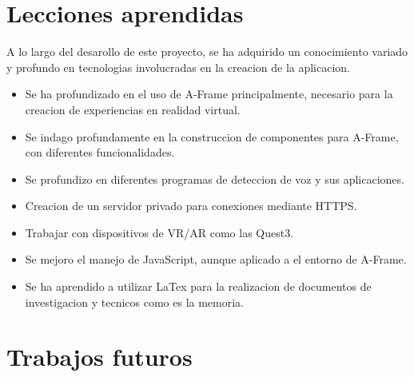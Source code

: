 \documentclass[a4paper, 12pt]{book}
\begin{document}
\section{Lecciones aprendidas}
\label{sec:lecciones_aprendidas}
A lo largo del desarollo de este proyecto, se ha adquirido un conocimiento variado y profundo en tecnologias involucradas en la creacion de la aplicacion.
\begin{itemize}
  \item Se ha profundizado en el uso de A-Frame principalmente, necesario para la creacion de experiencias en realidad virtual.
  \item Se indago profundamente en la construccion de componentes para A-Frame, con diferentes funcionalidades.
  \item Se profundizo en diferentes programas de deteccion de voz y sus aplicaciones.
  \item Creacion de un servidor privado para conexiones mediante HTTPS.
  \item Trabajar con dispositivos de VR/AR como las Quest3.
  \item Se mejoro el manejo de JavaScript, aunque aplicado a el entorno de A-Frame.
  \item Se ha aprendido a utilizar LaTex para la realizacion de documentos de investigacion y tecnicos como es la memoria.
\end{itemize}


\section{Trabajos futuros}
\label{sec:trabajos_futuros}
\end{document}

